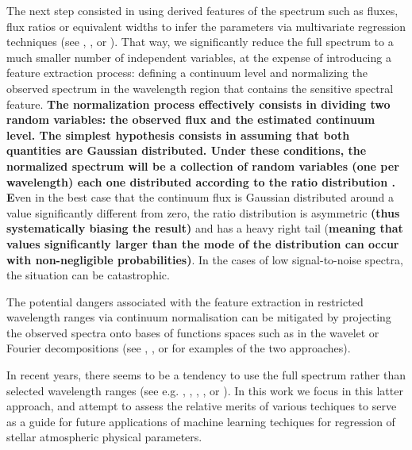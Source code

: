 \documentclass[a4paper,fleqn,usenatbib]{mnras}
\begin{document}
The next step consisted in using derived features of the spectrum such
as fluxes, flux ratios or equivalent widths to infer the parameters
via multivariate regression techniques (see
\cite{2006ApJ...636..804A}, \cite{2012ApJ...750L..37M}, or
\cite{2006A&A...456.1109M}). That way, we significantly reduce the
full spectrum to a much smaller number of independent variables, at
the expense of introducing a feature extraction process: defining a
continuum level and normalizing the observed spectrum in the
wavelength region that contains the sensitive spectral feature. 
{\bf The normalization process effectively consists in dividing two 
	random variables: the observed flux and the estimated continuum 
	level. The simplest hypothesis consists in assuming that both 
	quantities are Gaussian distributed. Under these conditions, the normalized 
	spectrum will be a collection of random variables (one per 
	wavelength) each one distributed according to the ratio 
	distribution \citep[see e.g.][]{10.2307/2342070, 
		doi:10.1080/01621459.1965.10480783}. E}ven in the best case 
that the continuum flux is Gaussian distributed around a value significantly
different from zero, the ratio distribution is asymmetric {\bf (thus 
systematically biasing the result)} and has a heavy right tail 
{(\bf meaning that values significantly larger than the mode of the 
	distribution can occur with non-negligible probabilities)}. In the 
cases of low signal-to-noise spectra, the situation can be catastrophic.

The potential dangers associated with the feature extraction in
restricted wavelength ranges via continuum normalisation can be
mitigated by projecting the observed spectra onto bases of functions
spaces such as in the wavelet or Fourier decompositions (see
\cite{2010PASP..122..608M}, \cite{2015MNRAS.452.1394L}, or
\cite{2015ApJS..218....3L} for examples of the two approaches).

In recent years, there seems to be a tendency to use the full spectrum
rather than selected wavelength ranges (see
e.g. \cite{2012ApJ...757..161T}, \cite{2014A&A...567A...5R}, \cite{2015ApJ...808...16N},
\cite{2015MNRAS.448.2717W}, or \cite{2015arXiv151000111R}). In this
work we focus in this latter approach, and attempt to assess the
relative merits of various techiques to serve as a guide for future
applications of machine learning techiques for regression of stellar
atmospheric physical parameters.
\end{document}
